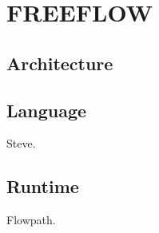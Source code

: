 \chapter{FREEFLOW}
\label{freeflow}

\section{Architecture}
\label{freeflow:arch}

\section{Language}
\label{freeflow:lang}
Steve.

\section{Runtime}
\label{freeflow:runtime}
Flowpath.
